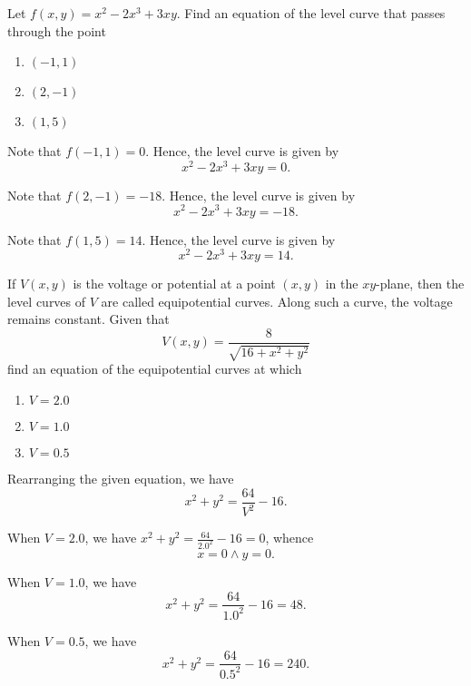 \begin{problem}
    Let $f(x, y) = x^2 - 2x^3 + 3xy$. Find an equation of the level curve that passes through the point
    \begin{enumerate}
        \item $(-1, 1)$
        \item $(2, -1)$
        \item $(1, 5)$
    \end{enumerate}
\end{problem}
\begin{solution}
    \begin{ppart}
        Note that $f(-1, 1) = 0$. Hence, the level curve is given by \[x^2 - 2x^3 + 3xy = 0.\]
    \end{ppart}
    \begin{ppart}
        Note that $f(2, -1) = -18$. Hence, the level curve is given by \[x^2 - 2x^3 + 3xy = -18.\]
    \end{ppart}
    \begin{ppart}
        Note that $f(1, 5) = 14$. Hence, the level curve is given by \[x^2 - 2x^3 + 3xy = 14.\]
    \end{ppart}
\end{solution}

\begin{problem}
    If $V(x, y)$ is the voltage or potential at a point $(x, y)$ in the $xy$-plane, then the level curves of $V$ are called equipotential curves. Along such a curve, the voltage remains constant. Given that \[V(x, y) = \frac{8}{\sqrt{16 + x^2 + y^2}}\] find an equation of the equipotential curves at which
    \begin{enumerate}
        \item $V = 2.0$
        \item $V = 1.0$
        \item $V = 0.5$
    \end{enumerate}
\end{problem}
\begin{solution}
    Rearranging the given equation, we have \[x^2 + y^2 = \frac{64}{V^2} - 16.\]

    \begin{ppart}
        When $V = 2.0$, we have $x^2 + y^2 = \frac{64}{2.0^2} - 16 = 0$, whence \[x = 0 \land y = 0.\]
    \end{ppart}
    \begin{ppart}
        When $V = 1.0$, we have \[x^2 + y^2 = \frac{64}{1.0^2} - 16 = 48.\]
    \end{ppart}
    \begin{ppart}
        When $V = 0.5$, we have \[x^2 + y^2 = \frac{64}{0.5^2} - 16 = 240.\]
    \end{ppart}
\end{solution}

